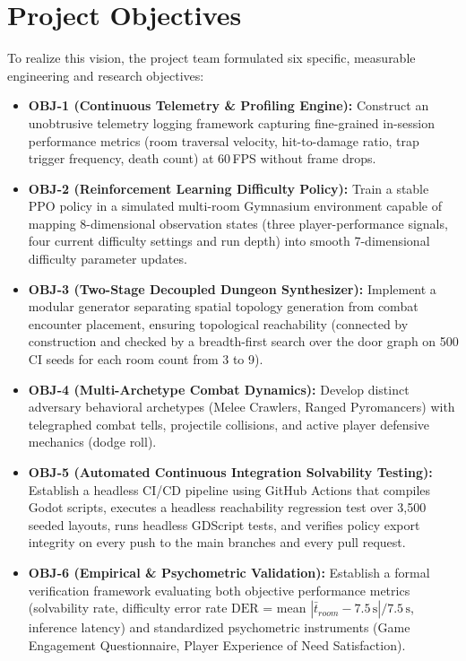 \section{Project Objectives}
To realize this vision, the project team formulated six specific, measurable engineering and research objectives:
\begin{itemize}
    \item \textbf{OBJ-1 (Continuous Telemetry \& Profiling Engine):} Construct an unobtrusive telemetry logging framework capturing fine-grained in-session performance metrics (room traversal velocity, hit-to-damage ratio, trap trigger frequency, death count) at 60\,FPS without frame drops.
    \item \textbf{OBJ-2 (Reinforcement Learning Difficulty Policy):} Train a stable PPO policy in a simulated multi-room Gymnasium environment capable of mapping 8-dimensional observation states (three player-performance signals, four current difficulty settings and run depth) into smooth 7-dimensional difficulty parameter updates.
    \item \textbf{OBJ-3 (Two-Stage Decoupled Dungeon Synthesizer):} Implement a modular generator separating spatial topology generation from combat encounter placement, ensuring topological reachability (connected by construction and checked by a breadth-first search over the door graph on 500 CI seeds for each room count from 3 to 9).
    \item \textbf{OBJ-4 (Multi-Archetype Combat Dynamics):} Develop distinct adversary behavioral archetypes (Melee Crawlers, Ranged Pyromancers) with telegraphed combat tells, projectile collisions, and active player defensive mechanics (dodge roll).
    \item \textbf{OBJ-5 (Automated Continuous Integration Solvability Testing):} Establish a headless CI/CD pipeline using GitHub Actions that compiles Godot scripts, executes a headless reachability regression test over 3,500 seeded layouts, runs headless GDScript tests, and verifies policy export integrity on every push to the main branches and every pull request.
    \item \textbf{OBJ-6 (Empirical \& Psychometric Validation):} Establish a formal verification framework evaluating both objective performance metrics (solvability rate, difficulty error rate $\text{DER}$ = mean $|\bar{t}_{room} - 7.5\,\text{s}|/7.5\,\text{s}$, inference latency) and standardized psychometric instruments (Game Engagement Questionnaire, Player Experience of Need Satisfaction).
\end{itemize}

